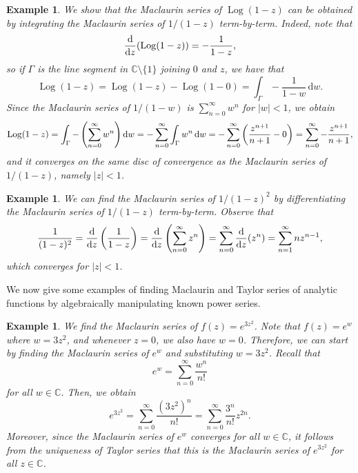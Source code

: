 \documentclass[10pt]{article}
\newcommand{\C}{\mathbb{C}}
\newcommand{\dd}{\,\mathrm{d}}
\newcommand{\ddz}{\frac{\rm d}{{\rm d}z}}
\DeclareMathOperator{\Log}{Log}
\theoremstyle{newstyle}
\newtheorem{exmp}[thm]{Example}
\begin{document}
\begin{exmp}
We show that the Maclaurin series of $\Log(1-z)$ can be obtained by integrating the 
Maclaurin series of $1/(1-z)$ term-by-term. Indeed, note that 
\[ \ddz (\Log(1-z)) = -\frac1{1-z}, \]
so if $\Gamma$ is the line segment in $\C \setminus \{1\}$ joining $0$ and $z$, we have that 
\[ \Log(1-z) = \Log(1-z) - \Log(1-0) = \int_\Gamma -\frac1{1-w}\dd w. \]
Since the Maclaurin series of $1/(1-w)$ is $\sum_{n=0}^\infty w^n$ for $|w| < 1$, we obtain 
\[ \Log(1-z) = \int_\Gamma - \left( \sum_{n=0}^\infty w^n \right) {\rm d}w = 
-\sum_{n=0}^\infty \int_\Gamma w^n\dd w = -\sum_{n=0}^\infty \left( \frac{z^{n+1}}{n+1} - 0 \right) 
= \sum_{n=0}^\infty -\frac{z^{n+1}}{n+1}, \]
and it converges on the same disc of convergence as the Maclaurin series of 
$1/(1-z)$, namely $|z| < 1$. 
\end{exmp}

\begin{exmp}
We can find the Maclaurin series of $1/(1-z)^2$ by differentiating the Maclaurin series of 
$1/(1-z)$ term-by-term. Observe that 
\[ \frac{1}{(1-z)^2} = \ddz \left( \frac1{1-z} \right) = \ddz \left( \sum_{n=0}^\infty z^n \right)
= \sum_{n=0}^\infty \ddz (z^n) = \sum_{n=1}^\infty nz^{n-1}, \]
which converges for $|z| < 1$. 
\end{exmp}

We now give some examples of finding Maclaurin and Taylor series of 
analytic functions by algebraically manipulating 
known power series. 

\begin{exmp}
We find the Maclaurin series of $f(z) = e^{3z^2}$. Note that $f(z) = e^w$ where $w = 3z^2$, 
and whenever $z = 0$, we also have $w = 0$. Therefore, we can start by finding the 
Maclaurin series of $e^w$ and substituting $w = 3z^2$. Recall that 
\[ e^w = \sum_{n=0}^\infty \frac{w^n}{n!} \]
for all $w \in \C$. Then, we obtain 
\[ e^{3z^2} = \sum_{n=0}^\infty \frac{(3z^2)^n}{n!} = \sum_{n=0}^\infty \frac{3^n}{n!} z^{2n}. \]
Moreover, since the Maclaurin series of $e^w$ converges for all $w \in \C$, it follows from the 
uniqueness of Taylor series that this is the Maclaurin series of $e^{3z^2}$ for all $z \in \C$. 
\end{exmp}
\end{document}
